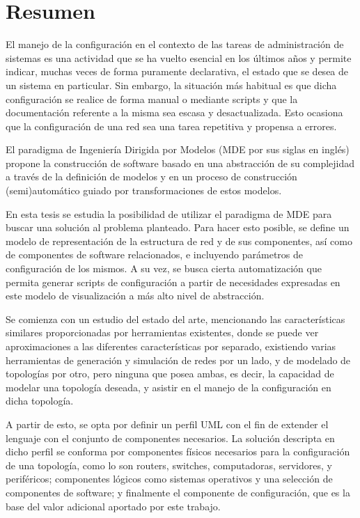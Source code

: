 \chapter*{Resumen}



El manejo de la configuración en el contexto de las tareas de administración de sistemas es una actividad que se ha vuelto esencial en los últimos años y permite indicar, muchas veces de forma puramente declarativa, el estado que se desea de un sistema en particular. Sin embargo, la situación más habitual es que dicha configuración se realice de forma manual o mediante scripts y que la documentación referente a la misma sea escasa y desactualizada. Esto ocasiona que la configuración de una red sea una tarea repetitiva y propensa a errores.


El paradigma de Ingeniería Dirigida por Modelos (MDE por sus siglas en inglés) propone la construcción de software basado en una abstracción de su complejidad a través de la definición de modelos y en un proceso de construcción (semi)automático guiado por transformaciones de estos modelos.

En esta tesis se estudia la posibilidad de utilizar el paradigma de MDE para buscar una solución al problema planteado. Para hacer esto posible, se define un modelo de representación de la estructura de red y de sus componentes, así como de componentes de software relacionados, e incluyendo parámetros de configuración de los mismos. A su vez, se busca cierta automatización que permita generar scripts de configuración a partir de necesidades expresadas en este modelo de visualización a más alto nivel de abstracción.

Se comienza con un estudio del estado del arte, mencionando las características similares proporcionadas por herramientas existentes, donde se puede ver aproximaciones a las diferentes características por separado, existiendo varias herramientas de generación y simulación de redes por un lado, y de modelado de topologías por otro, pero ninguna que posea ambas, es decir, la capacidad de modelar una topología deseada, y asistir en el manejo de la configuración en dicha topología.

A partir de esto, se opta por definir un perfil UML con el fin de extender el lenguaje con el conjunto de componentes necesarios. La solución descripta en dicho perfil se conforma por componentes físicos necesarios para la configuración de una topología, como lo son routers, switches, computadoras, servidores, y periféricos; componentes lógicos como sistemas operativos y una selección de componentes de software; y finalmente el componente de configuración, que es la base del valor adicional aportado por este trabajo.

